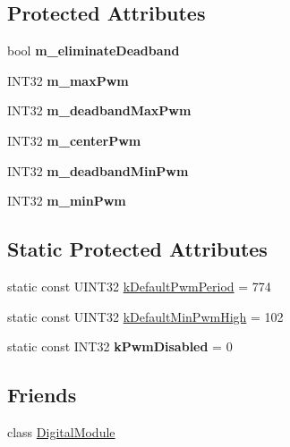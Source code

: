 \subsection*{Protected Attributes}
\begin{DoxyCompactItemize}
\item 
\hypertarget{classPWM_a80b83bf5f9751ceaf6439fccab8fe5d0}{
bool {\bfseries m\_\-eliminateDeadband}}
\label{classPWM_a80b83bf5f9751ceaf6439fccab8fe5d0}

\item 
\hypertarget{classPWM_a2494b8bdaa325b304c1f3ef9c2c0cf4f}{
INT32 {\bfseries m\_\-maxPwm}}
\label{classPWM_a2494b8bdaa325b304c1f3ef9c2c0cf4f}

\item 
\hypertarget{classPWM_ad679eaccdc7edfd3eb2c6b52f41669a9}{
INT32 {\bfseries m\_\-deadbandMaxPwm}}
\label{classPWM_ad679eaccdc7edfd3eb2c6b52f41669a9}

\item 
\hypertarget{classPWM_ae675cc802a52f61413ea64823e843f93}{
INT32 {\bfseries m\_\-centerPwm}}
\label{classPWM_ae675cc802a52f61413ea64823e843f93}

\item 
\hypertarget{classPWM_a51086c285825c581369217b0f4e4a527}{
INT32 {\bfseries m\_\-deadbandMinPwm}}
\label{classPWM_a51086c285825c581369217b0f4e4a527}

\item 
\hypertarget{classPWM_abceceb853052bcb9c84a79a6e034d368}{
INT32 {\bfseries m\_\-minPwm}}
\label{classPWM_abceceb853052bcb9c84a79a6e034d368}

\end{DoxyCompactItemize}
\subsection*{Static Protected Attributes}
\begin{DoxyCompactItemize}
\item 
static const UINT32 \hyperlink{classPWM_ad76e35266df11ca46f9792492671379a}{kDefaultPwmPeriod} = 774
\item 
static const UINT32 \hyperlink{classPWM_a6d481a094dc4d1df83cfd77b2d6bbf06}{kDefaultMinPwmHigh} = 102
\item 
\hypertarget{classPWM_a1128d7b7ad8cb6a4d3bb49ef4c08fbfa}{
static const INT32 {\bfseries kPwmDisabled} = 0}
\label{classPWM_a1128d7b7ad8cb6a4d3bb49ef4c08fbfa}

\end{DoxyCompactItemize}
\subsection*{Friends}
\begin{DoxyCompactItemize}
\item 
\hypertarget{classPWM_aa15053da4e6cbe2d051a32116bcfbf2b}{
class \hyperlink{classPWM_aa15053da4e6cbe2d051a32116bcfbf2b}{DigitalModule}}
\label{classPWM_aa15053da4e6cbe2d051a32116bcfbf2b}

\end{DoxyCompactItemize}


